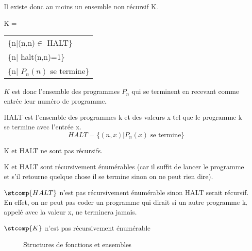 Il existe donc au moins un ensemble non récursif
K.

\begin{mydef}[K]
	K =
	\begin{tabular}{l}
		\{n|(n,n)$\in$ HALT\}\\
		\{n| halt(n,n)=1\}\\
		\{n| $P_n(n)$ se termine\}
	\end{tabular}

	$K$ est donc l'ensemble des programmes $P_n$ qui se terminent en recevant comme entrée leur numéro de programme.
\end{mydef}

\begin{mydef}[HALT]
	HALT est l'ensemble des programmes k et des valeurs x tel que le programme k se termine avec l'entrée x.
	\[ HALT = \{(n,x)|P_n(x)\text{ se termine}\}\]
\end{mydef}

\begin{myprop}
	K et HALT ne sont pas récursifs.
\end{myprop}

\begin{myprop}
	K et HALT sont récursivement énumérables (car il suffit de lancer le programme et s’il retourne quelque chose il se termine sinon on ne peut rien dire).
\end{myprop}

\begin{myprop}
	$\stcomp{HALT}$ n'est pas récursivement énumérable sinon HALT serait récursif.  En effet, on ne peut pas coder un programme qui dirait si un autre programme k, appelé avec la valeur x, ne terminera jamais.
\end{myprop}

\begin{myprop}
	$\stcomp{K}$ n'est pas récursivement énumérable
\end{myprop}

\begin{figure}[h]
  \centering
  \caption{Structures de fonctions et ensembles}
  \label{rb}
\end{figure}

